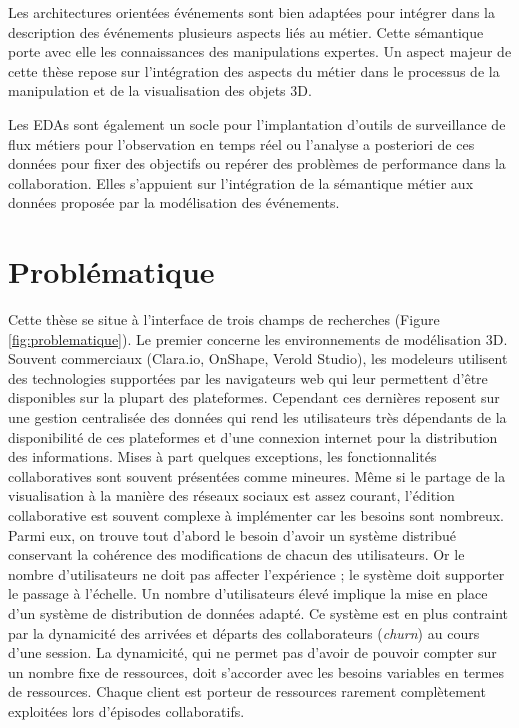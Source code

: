 Les architectures orientées 
événements sont bien adaptées pour intégrer dans la description des 
événements plusieurs aspects liés au métier. 
Cette sémantique porte avec elle les connaissances des manipulations expertes.
Un aspect majeur de cette thèse repose sur l'intégration des aspects du métier dans le 
processus de la manipulation et de la visualisation des objets \gls{3D}. 

Les \glspl{EDA} sont également un socle pour l'implantation d'outils de surveillance 
de flux métiers pour l'observation en temps réel ou l'analyse a posteriori de ces 
données pour fixer des objectifs ou repérer 
des problèmes de performance dans la collaboration. Elles s'appuient sur l'intégration 
de la sémantique métier aux données proposée par la modélisation des événements.
%
\section{Problématique}


Cette thèse se situe à l'interface de trois champs de recherches (Figure 
\ref{fig:problematique}). Le premier concerne les environnements de modélisation 
3D. Souvent commerciaux (Clara.io, OnShape, Verold Studio), les modeleurs 
utilisent des technologies supportées par les navigateurs web qui leur permettent 
d'être disponibles sur la plupart des plateformes. 
Cependant ces dernières reposent sur une gestion centralisée des données qui rend 
les utilisateurs très dépendants de la disponibilité de ces plateformes et d'une 
connexion internet pour la distribution des informations. 
Mises à part quelques exceptions, les fonctionnalités collaboratives 
sont souvent présentées comme mineures. Même si le \og partage\fg{} de la 
visualisation à la manière des \og réseaux sociaux\fg{} est assez courant, l'édition 
collaborative est souvent complexe à implémenter car les besoins sont nombreux. 
Parmi eux, on trouve tout d'abord le besoin d'avoir un système distribué 
conservant la cohérence des modifications de chacun des utilisateurs. Or 
le nombre d'utilisateurs ne doit pas affecter l'expérience ; le système 
doit supporter le passage à l'échelle. 
Un nombre d'utilisateurs élevé implique la mise en place d'un système de 
distribution de données adapté. Ce système est en plus contraint par la dynamicité
des arrivées et départs des collaborateurs (\textit{churn}) au cours d'une session. 
La dynamicité, qui ne permet pas d'avoir de pouvoir compter sur un nombre fixe de 
ressources, doit s'accorder avec les besoins variables en termes de ressources. 
Chaque client est porteur de ressources rarement complètement exploitées lors 
d'épisodes collaboratifs.

